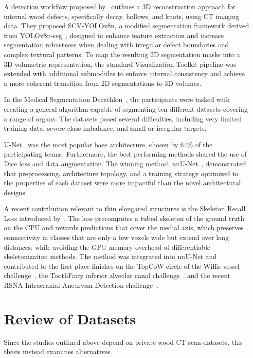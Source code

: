 A detection workflow proposed by~\cite{xie2026deep} outlines a 3D reconstruction approach for internal wood defects, specifically decay, hollows, and knots, using CT imaging data. They proposed SCV-YOLOv8n, a modified segmentation framework derived from YOLOv8n-seg~\cite{yolov8_ultralytics}, designed to enhance feature extraction and increase segmentation robustness when dealing with irregular defect boundaries and complex textural patterns. To map the resulting 2D segmentation masks into a 3D volumetric representation, the standard Visualization Toolkit pipeline was extended with additional submodules to enforce internal consistency and achieve a more coherent transition from 2D segmentations to 3D volumes.


In the Medical Segmentation
Decathlon~\cite{antonelli2022msd}, the participants were
tasked with creating a general algorithm capable of segmenting ten different
datasets covering a range of organs. The datasets posed several difficulties,
including very limited training data,
severe class imbalance, and small or irregular targets.

U-Net~\cite{ronneberger2015unet} was the most popular base architecture, chosen by 64\% of the
participating teams. Furthermore, the best performing methods shared the use of Dice loss and data augmentation. The
winning method, nnU-Net~\cite{isensee2021nnunet},
demonstrated that preprocessing, architecture
topology, and a training strategy optimized to the properties of each dataset were more impactful than the novel architectural designs.

A recent contribution relevant to thin elongated structures is the Skeleton Recall Loss introduced by~\cite{kirchhoff2024skeletonrecall}. The loss precomputes a tubed skeleton of the ground truth on the CPU and rewards predictions that cover the medial axis, which preserves connectivity in classes that are only a few voxels wide but extend over long distances, while avoiding the GPU memory overhead of differentiable skeletonization methods. The method was integrated into nnU-Net and contributed to the first place finishes on the TopCoW circle of the Willis vessel challenge~\cite{topcow2023}, the ToothFairy inferior alveolar canal challenge~\cite{toothfairy2023}, and the recent RSNA Intracranial Aneurysm Detection challenge~\cite{rsna2025aneurysm}.


\section{Review of Datasets}
Since the studies outlined above depend on private wood CT scan datasets, this thesis instead examines alternatives.

